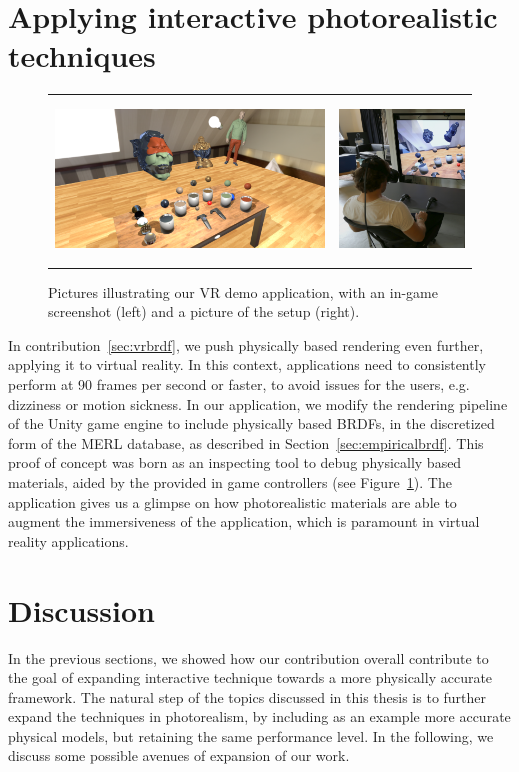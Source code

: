 \section{Applying interactive photorealistic techniques}
\begin{figure}[t]
\centering
\begin{tabular}{@{}c@{}c@{}}
	 \includegraphics[height = 4.3cm]{figures/screen1_crop} &
		 \includegraphics[height = 4.3cm]{figures/person} \\[-2.5ex]
\end{tabular}
  \caption{Pictures illustrating our VR demo application, with an in-game screenshot (left) and a picture of the setup (right). }
  \label{fig:vrbrdfimage}
\end{figure}
In contribution~\ref{sec:vrbrdf}, we push physically based rendering even further, applying it to virtual reality. In this context, applications need to consistently perform at 90 frames per second or faster, to avoid issues for the users, e.g. dizziness or motion sickness. In our application, we modify the rendering pipeline of the Unity game engine  to include physically based BRDFs, in the discretized form of the MERL database, as described in Section~\ref{sec:empiricalbrdf}. This proof of concept was born as an inspecting tool to debug physically based materials, aided by the provided in game controllers (see Figure~\ref{fig:vrbrdfimage}). The application gives us a glimpse on how photorealistic materials are able to augment the immersiveness of the application, which is paramount in virtual reality applications.

\section{Discussion}
In the previous sections, we showed how our contribution overall contribute to the goal of expanding interactive technique towards a more physically accurate framework. The natural step of the topics discussed in this thesis is to further expand the techniques in photorealism, by including as an example more accurate physical models, but retaining the same performance level. In the following, we discuss some possible avenues of expansion of our work.

